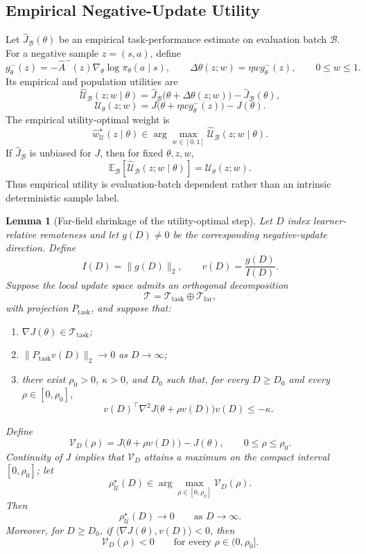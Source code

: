 \documentclass{article}
\theoremstyle{plain}
\newtheorem{lemma}[theorem]{Lemma}
\theoremstyle{definition}
\theoremstyle{remark}
\begin{document}
\subsection{Empirical Negative-Update Utility}
\label{app:negative_update_utility}

Let \(\widehat J_{\mathcal B}(\theta)\) be an empirical task-performance
estimate on evaluation batch \(\mathcal B\). For a negative sample
\(z=(s,a)\), define
\[
g_\theta^-(z)
=
-\widehat A^-(z)\nabla_\theta\log\pi_\theta(a\mid s),
\qquad
\Delta\theta(z;w)
=
\eta w g_\theta^-(z),
\qquad
0\le w\le1.
\]
Its empirical and population utilities are
\[
\widehat{\mathcal U}_{\mathcal B}(z;w\mid\theta)
=
\widehat J_{\mathcal B}\bigl(\theta+\Delta\theta(z;w)\bigr)
-
\widehat J_{\mathcal B}(\theta),
\]
\[
\mathcal U_\theta(z;w)
=
J\bigl(\theta+\eta w g_\theta^-(z)\bigr)-J(\theta).
\]
The empirical utility-optimal weight is
\[
\widehat w_{\mathcal U}^\star(z\mid\theta)
\in
\arg\max_{w\in[0,1]}
\widehat{\mathcal U}_{\mathcal B}(z;w\mid\theta).
\]
If \(\widehat J_{\mathcal B}\) is unbiased for \(J\), then for fixed
\(\theta,z,w\),
\[
\mathbb E_{\mathcal B}
\left[
\widehat{\mathcal U}_{\mathcal B}(z;w\mid\theta)
\right]
=
\mathcal U_\theta(z;w).
\]
Thus empirical utility is evaluation-batch dependent rather than an
intrinsic deterministic sample label.

\begin{lemma}[Far-field shrinkage of the utility-optimal step]
\label{lem:far_field_utility}
Let \(D\) index learner-relative remoteness and let \(g(D)\ne0\) be the
corresponding negative-update direction. Define
\[
I(D)=\|g(D)\|_2,
\qquad
v(D)=\frac{g(D)}{I(D)}.
\]
Suppose the local update space admits an
orthogonal decomposition
\[
\mathcal T
=
\mathcal T_{\mathrm{task}}
\oplus
\mathcal T_{\mathrm{far}},
\]
with projection \(P_{\mathrm{task}}\), and suppose that:
\begin{enumerate}
    \item \(\nabla J(\theta)\in\mathcal T_{\mathrm{task}}\);

    \item \(\|P_{\mathrm{task}}v(D)\|_2\to0\) as \(D\to\infty\);

    \item there exist \(\rho_0>0\), \(\kappa>0\), and \(D_0\) such that,
    for every \(D\ge D_0\) and every \(\rho\in[0,\rho_0]\),
    \[
    v(D)^\top
    \nabla^2J\bigl(\theta+\rho v(D)\bigr)
    v(D)
    \le
    -\kappa.
    \]
\end{enumerate}
Define
\[
\mathcal V_D(\rho)
=
J\bigl(\theta+\rho v(D)\bigr)-J(\theta),
\qquad
0\le\rho\le\rho_0.
\]
Continuity of \(J\) implies that \(\mathcal V_D\) attains a maximum
on the compact interval \([0,\rho_0]\); let
\[
\rho_{\mathcal U}^\star(D)
\in
\arg\max_{\rho\in[0,\rho_0]}
\mathcal V_D(\rho).
\]
Then
\[
\rho_{\mathcal U}^\star(D)\to0
\qquad
\text{as }D\to\infty.
\]
Moreover, for \(D\ge D_0\), if
\(\langle\nabla J(\theta),v(D)\rangle<0\), then
\[
\mathcal V_D(\rho)<0
\qquad
\text{for every }\rho\in(0,\rho_0].
\]
\end{lemma}
\end{document}
